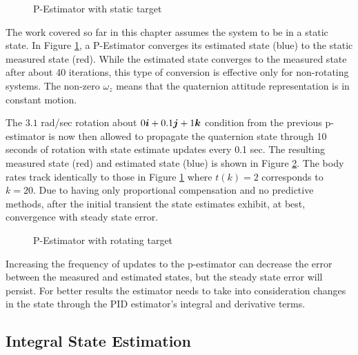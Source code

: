 \begin{figure}[H]
  \centerline{}
  \caption{P-Estimator with static target}
  \label{fig:PEstimatorwithstatictarget}
\end{figure}

The work covered so far in this chapter assumes the system to be in a static state.  In Figure \ref{fig:PEstimatorwithstatictarget}, a P-Estimator converges its estimated state (blue) to the static measured state (red).  While the estimated state converges to the measured state after about 40 iterations, this type of conversion is effective only for non-rotating systems.  The non-zero $\omega_z$ means that the quaternion attitude representation is in constant motion.

The $3.1$ rad/sec rotation about $0\boldsymbol{i} + 0.1\boldsymbol{j} + 1\boldsymbol{k}$ condition from the previous p-estimator is now then allowed to propagate the quaternion state through 10 seconds of rotation with state estimate updates every 0.1 sec.  The resulting measured state (red) and estimated state (blue) is shown in Figure \ref{fig:PEstimatorwithrotatingtarget}.  The body rates track identically to those in Figure \ref{fig:PEstimatorwithstatictarget} where $t(k) = 2$ corresponds to $k = 20$.  Due to having only proportional compensation and no predictive methods, after the initial transient the state estimates exhibit, at best, convergence with steady state error.

\begin{figure}[H]
  \centerline{}
  \caption{P-Estimator with rotating target}
  \label{fig:PEstimatorwithrotatingtarget}
\end{figure}

Increasing the frequency of updates to the p-estimator can decrease the error between the measured and estimated states, but the steady state error will persist.  For better results the estimator needs to take into consideration changes in the state through the PID estimator's integral and derivative terms.

\subsection{Integral State Estimation}
\label{subsec:IntegralEstimator}

